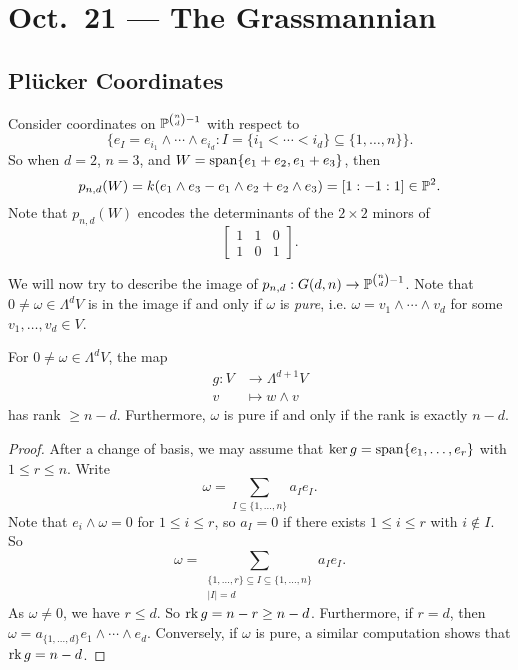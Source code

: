 \chapter{Oct.~21 --- The Grassmannian}

\section{Pl\"ucker Coordinates}

\begin{remark}
  Consider coordinates on $\mathbb{P}^{\binom{n}{d} - 1}$
  with respect to
  \[
    \{
      e_I = e_{i_1} \wedge \cdots \wedge e_{i_d}
      : I = \{i_1 < \cdots < i_d\} \subseteq \{1, \ldots, n\}
    \}.
  \]
  So when $d = 2$, $n = 3$, and
  $W = \operatorname{span}\{e_1 + e_2, e_1 + e_3\}$, then
  \[
    p_{n, d}(W)
    = k(e_1 \wedge e_3 - e_1 \wedge e_2 + e_2 \wedge e_3)
    = [1 : -1 : 1] \in \mathbb{P}^2.
  \]
  Note that $p_{n, d}(W)$ encodes the
  determinants of the $2 \times 2$ minors
  of
  \[
    \begin{bmatrix}
      1 & 1 & 0 \\
      1 & 0 & 1
    \end{bmatrix}.
  \]
\end{remark}

\begin{remark}
  We will now try to describe the image
  of $p_{n, d} : G(d, n) \to \mathbb{P}^{\binom{n}{d} - 1}$.
  Note that $0 \ne \omega \in \Lambda^d V$
  is in the image if and only if $\omega$
  is \emph{pure}, i.e. $\omega = v_1 \wedge \cdots \wedge v_d$
  for some $v_1, \ldots, v_d \in V$.
\end{remark}

\begin{prop}\label{prop:rank-wedge}
  For $0 \ne \omega \in \Lambda^d V$, the map
  \begin{align*}
    g : V &\longrightarrow \Lambda^{d + 1} V \\
    v &\longmapsto w \wedge v
  \end{align*}
  has rank $\ge n - d$. Furthermore,
  $\omega$ is pure if and only if the rank
  is exactly $n - d$.
\end{prop}

\begin{proof}
  After a change of basis, we may
assume that $\ker g = \operatorname{span}\{e_1, \dots, e_r\}$
with $1 \le r \le n$. Write
\[
  \omega = \sum_{I \subseteq \{1, \dots, n\}} a_I e_I.
\]
Note that $e_i \wedge \omega = 0$ for
$1 \le i \le r$, so $a_I = 0$ if
there exists $1 \le i \le r$ with $i \notin I$. So
\[
  \omega = \sum_{\substack{\{1, \dots, r\} \subseteq I \subseteq \{1, \dots, n\}\\|I| = d}} a_I e_I.
  \]
  As $\omega \ne 0$, we have $r \le d$.
  So $\operatorname{rk} g = n - r \ge n - d$.
  Furthermore, if $r = d$, then
  $\omega = a_{\{1, \dots, d\}} e_1 \wedge \cdots \wedge e_d$.
  Conversely, if $\omega$ is pure, a
  similar computation shows that
  $\operatorname{rk} g = n - d$.
\end{proof}

